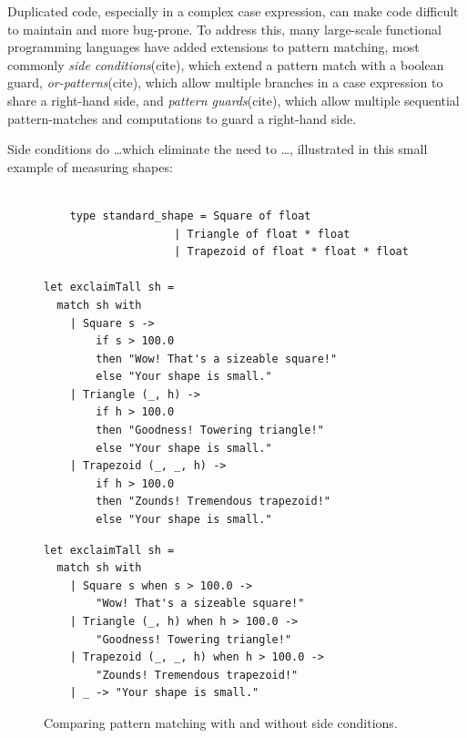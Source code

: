 \documentclass[article,screen,12pt, nonacm]{acmart}
\begin{document}



    


    Duplicated code, especially in a complex case expression, can make code
    difficult to maintain and more bug-prone. To address this, many large-scale
    functional programming languages have added extensions to pattern matching,
    most commonly \textit{side conditions}(cite), which extend a pattern match with a
    boolean guard, \textit{or-patterns}(cite), which allow multiple branches in a case
    expression to share a right-hand side, and \textit{pattern guards}(cite), which
    allow multiple sequential pattern-matches and computations to guard a
    right-hand side. 

    Side conditions do \dots which eliminate the need to \dots, 
    illustrated in this small example of measuring shapes: 


      
          \begin{figure}[h]
\centering
\begin{minipage}{0.45\linewidth}
\small
\begin{verbatim}

    type standard_shape = Square of float 
                    | Triangle of float * float
                    | Trapezoid of float * float * float

let exclaimTall sh =
  match sh with 
    | Square s -> 
        if s > 100.0 
        then "Wow! That's a sizeable square!"
        else "Your shape is small." 
    | Triangle (_, h) -> 
        if h > 100.0 
        then "Goodness! Towering triangle!"
        else "Your shape is small." 
    | Trapezoid (_, _, h) -> 
        if h > 100.0
        then "Zounds! Tremendous trapezoid!"
        else "Your shape is small." 
\end{verbatim}
\caption*{Without extensions}
\end{minipage}
\hfill
\begin{minipage}{0.45\linewidth}
\small
\begin{verbatim}
let exclaimTall sh =
  match sh with 
    | Square s when s > 100.0 ->
        "Wow! That's a sizeable square!"
    | Triangle (_, h) when h > 100.0 ->
        "Goodness! Towering triangle!"
    | Trapezoid (_, _, h) when h > 100.0 -> 
        "Zounds! Tremendous trapezoid!"
    | _ -> "Your shape is small." 
\end{verbatim}
\caption*{With side conditions}
\end{minipage}
\caption{Comparing pattern matching with and without side conditions.}
\end{figure}
\end{document}
